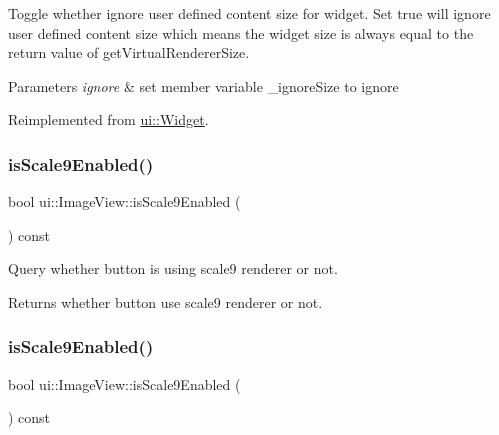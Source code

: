 Toggle whether ignore user defined content size for widget. Set true will ignore user defined content size which means the widget size is always equal to the return value of {\ttfamily get\+Virtual\+Renderer\+Size}.


\begin{DoxyParams}{Parameters}
{\em ignore} & set member variable \+\_\+ignore\+Size to ignore \\
\hline
\end{DoxyParams}


Reimplemented from \hyperlink{classui_1_1Widget_a47ec556e48f2ac20290c197e30434d36}{ui\+::\+Widget}.

\mbox{\label{classui_1_1ImageView_a773635821f82515c3fab2b1bf1715587}} 
\subsubsection{\texorpdfstring{is\+Scale9\+Enabled()}{isScale9Enabled()}\hspace{0.1cm}{\footnotesize\ttfamily [1/2]}}
{\footnotesize\ttfamily bool ui\+::\+Image\+View\+::is\+Scale9\+Enabled (\begin{DoxyParamCaption}{ }\end{DoxyParamCaption}) const}

Query whether button is using scale9 renderer or not. \begin{DoxyReturn}{Returns}
whether button use scale9 renderer or not. 
\end{DoxyReturn}
\mbox{\label{classui_1_1ImageView_a773635821f82515c3fab2b1bf1715587}} 
\subsubsection{\texorpdfstring{is\+Scale9\+Enabled()}{isScale9Enabled()}\hspace{0.1cm}{\footnotesize\ttfamily [2/2]}}
{\footnotesize\ttfamily bool ui\+::\+Image\+View\+::is\+Scale9\+Enabled (\begin{DoxyParamCaption}{ }\end{DoxyParamCaption}) const}

